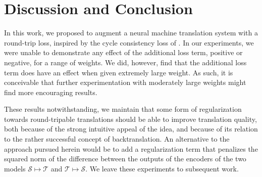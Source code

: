 \documentclass[11pt,a4paper]{article}
\begin{document}

\section{Discussion and Conclusion}\label{sec:discussion}
In this work, we proposed to augment a neural machine translation system with a round-trip loss, inspired by the cycle consistency loss of \citet{CycleGAN2017}. In our experiments, we were unable to demonstrate any effect of the additional loss term, positive or negative, for a range of weights. We did, however, find that the additional loss term does have an effect when given extremely large weight. As such, it is conceivable that further experimentation with moderately large weights might find more encouraging results. 

These results notwithstanding, we maintain that some form of regularization towards round-tripable translations should be able to improve translation quality, both because of the strong intuitive appeal of the idea, and because of its relation to the rather successful concept of backtranslation. An alternative to the approach pursued herein would be to add a regularization term that penalizes the squared norm of the difference between the outputs of the encoders of the two models $\mathcal{S}\mapsto\mathcal{T}$ and $\mathcal{T}\mapsto\mathcal{S}$. We leave these experiments to subsequent work.


\newpage

\end{document}
